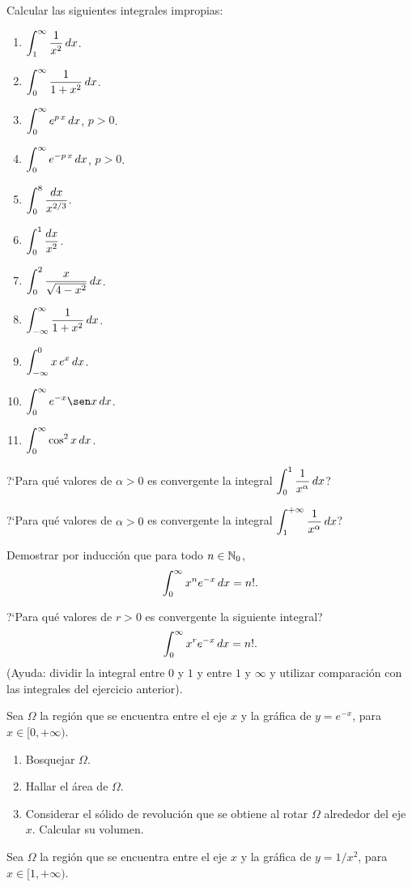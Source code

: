 \item Calcular las siguientes integrales impropias:
\begin{multicols}{2}
\begin{enumerate}
  \item $\displaystyle \int_1^\infty \frac1{x^2} \,dx$.
  \item $\displaystyle \int_0^\infty \frac1{1+x^2} \,dx$.
  \item $\displaystyle \int_0^\infty e^{p\,x}  \,dx$, $p>0$.
  \item $\displaystyle \int_0^\infty e^{-p\,x}  \,dx$, $p>0$.
  \item $\displaystyle \int_0^8 \frac{dx}{x^{2/3}}$.
  \item $\displaystyle \int_0^1 \frac{dx}{x^2}$.
  \item $\displaystyle \int_0^2 \frac{x}{\sqrt{4-x^2}}  \,dx$.
  \item $\displaystyle \int_{-\infty}^\infty \frac1{1+x^2}  \,dx$.
  \item $\displaystyle \int_{-\infty}^0 x\,e^x  \,dx$.
  \item $\D \int_0^\infty e^{-x}\sen x  \dx$.
  \item $\displaystyle \int_0^\infty \cos^2 x  \,dx$.
\end{enumerate}  
\end{multicols}
\item ?`Para qué valores de $\alpha>0$ es convergente la integral $\displaystyle \int_0^1 \frac1{x^\alpha}\,dx$?
\item ?`Para qué valores de $\alpha>0$ es convergente la integral $\displaystyle \int_1^{+\infty} \frac1{x^\alpha}\,dx$?
\item Demostrar por inducción que para todo $n\in\mathbb{N}_0$,
\[
\int_0^\infty x^n e^{-x}\,dx = n!.
\]
\item ?`Para qué valores de $r>0$ es convergente la siguiente integral?
\[
\int_0^\infty x^r e^{-x}\,dx = n!.
\]
(Ayuda: dividir la integral entre $0$ y $1$ y entre $1$ y $\infty$ y utilizar comparación con las integrales del ejercicio anterior).
\item Sea $\Omega$ la región que se encuentra entre el eje $x$ y la gráfica de $y=e^{-x}$, para $x\in[0,+\infty)$.
\begin{enumerate}
  \item Bosquejar $\Omega$.
  \item Hallar el área de $\Omega$.
  \item Considerar el sólido de revolución que se obtiene al rotar $\Omega$ alrededor del eje $x$. Calcular su volumen.
\end{enumerate}
\item Sea $\Omega$ la región que se encuentra entre el eje $x$ y la gráfica de $y=1/x^2$, para $x\in[1,+\infty)$.
